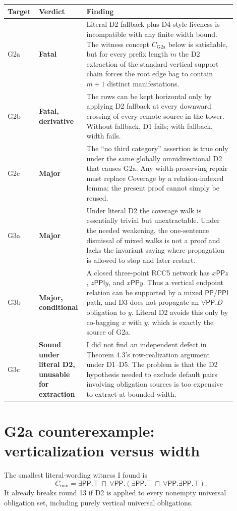 \documentclass[11pt]{article}
\newcommand{\PP}{\mathsf{PP}}
\newcommand{\PPI}{\mathsf{PPI}}
\newcommand{\severity}[1]{\textbf{#1}}
\begin{document}
\begin{longtable}{p{0.11\linewidth}p{0.16\linewidth}p{0.63\linewidth}}
\toprule
Target & Verdict & Finding \\
\midrule
G2a & \severity{Fatal} & Literal D2 fallback plus D4-style liveness is incompatible with any finite
width bound.  The witness concept $C_{\mathrm{G2a}}$ below is satisfiable, but
for every prefix length $m$ the D2 extraction of the standard vertical support
chain forces the root edge bag to contain $m+1$ distinct manifestations. \\
G2b & \severity{Fatal, derivative} & The rows can be kept horizontal only by applying D2 fallback at every downward
crossing of every remote source in the tower.  Without fallback, D1 fails; with
fallback, width fails. \\
G2c & \severity{Major} & The ``no third category'' assertion is true only under the same globally
omnidirectional D2 that causes G2a.  Any width-preserving repair must replace
Coverage by a relation-indexed lemma; the present proof cannot simply be
reused. \\
G3a & \severity{Major} & Under literal D2 the coverage walk is essentially trivial but
unextractable.  Under the needed weakening, the one-sentence dismissal of
mixed walks is not a proof and lacks the invariant saying where propagation is
allowed to stop and later restart. \\
G3b & \severity{Major, conditional} & A closed three-point RCC5 network has $x\PP z$, $z\PPI y$, and $x\PP y$.
Thus a vertical endpoint relation can be supported by a mixed $\PP/\PPI$ path,
and D3 does not propagate an $\forall\PP.D$ obligation to $y$.  Literal D2
avoids this only by co-bagging $x$ with $y$, which is exactly the source of
G2a. \\
G3c & \severity{Sound under literal D2, unusable for extraction} & I did not find an independent defect in Theorem 4.3's row-realization
argument under D1--D5.  The problem is that the D2 hypothesis needed to exclude
default pairs involving obligation sources is too expensive to extract at
bounded width. \\
\bottomrule
\end{longtable}

\section{G2a counterexample: verticalization versus width}

The smallest literal-wording witness I found is
\[
C_{\min}=\exists\PP.\top\ \sqcap\
        \forall\PP.(\exists\PP.\top\ \sqcap\ \forall\PP.\exists\PP.\top).
\]
It already breaks round 13 if D2 is applied to every nonempty universal
obligation set, including purely vertical universal obligations.
\end{document}
